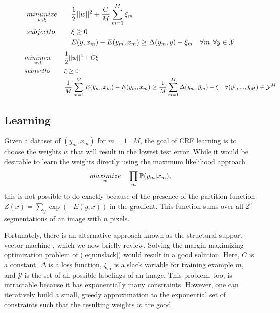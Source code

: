 \documentclass[journal]{IEEEtran}
\begin{document}
\begin{figure*}
  \normalsize
  \hrulefill
  
  \begin{equation}
    \begin{aligned}
      & \minimize{w, \xi} & & \frac{1}{2} ||w||^2 + \frac{C}{M} \sum_{m=1}^M \xi_m \label{eqn:nslack} \\
      & \st & & \xi \geq 0 \\
      & & & E ( y, x_m ) - E ( y_m, x_m ) \geq \Delta (y_m, y) - \xi_m \quad \forall m, \forall y \in \mathcal{Y} \\
    \end{aligned}
  \end{equation}
  \vspace{0.2in}
  \begin{equation}
    \begin{aligned}
      & \minimize{w, \xi} & & \frac{1}{2} ||w||^2 + C\xi \label{eqn:oneslack} \\
      & \st & & \xi \geq 0 \\
      & & & \frac{1}{M} \sum_{m=1}^M E ( \hat{y}_m, x_m )
      - E ( y_m, x_m ) \geq \frac{1}{M} \sum_{m=1}^M \Delta(y_m, \hat{y}_m) - \xi \quad \forall (\hat{y}_1, ..., \hat{y}_M) \in \mathcal{Y}^M
    \end{aligned}
  \end{equation}

  \hrulefill
  \vspace*{4pt}
\end{figure*}


\subsection{Learning}
\label{sec:learning}

Given a dataset of $(y_m, x_m)$ for $m=1 \dots M$, the goal of CRF learning is to choose the weights $w$ that will result in the lowest test error. While it would be desirable to learn the weights directly using the maximum likelihood approach
\begin{align}
  \underset{w}{\relax{maximize}}\quad \prod_m \mathbb{P}(y_m | x_m),
\end{align}
this is not possible to do exactly because of the presence of the partition function $Z(x) = \sum_{y} \exp(-E(y, x))$ in the gradient.  This function sums over all $2^n$ segmentations of an image with $n$ pixels.

Fortunately, there is an alternative approach known as the structural support vector machine \cite{taskar2005a, tsochantaridis2005a, szummer2008a}, which we now briefly review.  Solving the margin maximizing optimization problem of (\ref{eqn:nslack}) would result in a good solution. Here, $C$ is a constant, $\Delta$ is a loss function, $\xi_m$ is a slack variable for training example $m$, and $\mathcal{Y}$ is the set of all possible labelings of an image. This problem, too, is intractable because it has exponentially many constraints.  However, one can iteratively build a small, greedy approximation to the exponential set of constraints such that the resulting weights $w$ are good.
\end{document}
